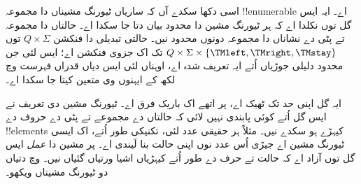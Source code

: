 \documentclass[../../../include/open-logic-section]{subfiles}
\begin{document}

\begin{explain}
اسی دکھا سکدے آں کہ ساریاں ٹیورنگ مشیناں دا مجموعہ !!{enumerable}
اے۔ ایہ ایس گل توں نکلدا اے کہ ہر ٹیورنگ مشین دا محدود بیان
دتا جا سکدا اے۔ حالتاں دا مجموعہ تے پٹی دے نشاناں دا مجموعہ
دونوں محدود نیں۔ حالتی تبدیلی دا فنکشن $Q \times \Sigma$
توں $Q \times \Sigma \times \{\TMleft, \TMright, \TMstay\}$
تک اک جزوی فنکشن اے؛ ایس لئی جن محدود دلیلی جوڑیاں اُتے
ایہ تعریف شدہ اے، اوہناں لئی ایس دیاں قدراں فہرست وچ لکھ
کے ایہنوں وی متعین کیتا جا سکدا اے۔

ایہ گل اپنی حد تک ٹھیک اے، پر اتھے اک باریک فرق اے۔ ٹیورنگ
مشین دی تعریف نے ایس گل اُتے کوئی پابندی نہیں لائی کہ حالتاں
دے مجموعے تے پٹی دے حروف دے !!{element}s کیہڑے ہو سکدے نیں۔
مثلاً ہر حقیقی عدد لئی، تکنیکی طور اُتے، اک ایسی ٹیورنگ مشین
اے جیڑی اُس عدد نوں اپنی حالت بنا لَیندی اے۔ پر مشین دا
\emph{عمل} ایس گل توں آزاد اے کہ حالت تے حرف دے طور اُتے کیہڑیاں
اشیا ورتیاں گئیاں نیں۔  وچ دتیاں دو ٹیورنگ
مشیناں ویکھو۔
\begin{figure}
\begin{center}
\\
\end{center}
\end{figure}
\end{explain}
\end{document}
